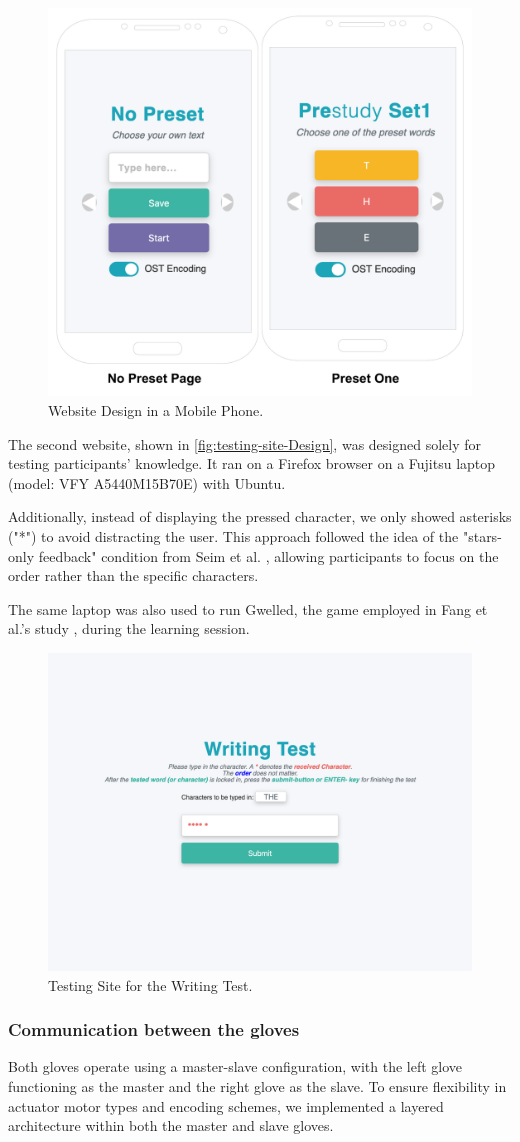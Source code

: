 \begin{figure}
    \centering
    \includegraphics[width=0.5\linewidth]{src/pictures/MobileWebsiteVersion.drawio.pdf}
    \caption{Website Design in a Mobile Phone.}
    \label{fig:Website-Design}
\end{figure}

The second website, shown in \autoref{fig:testing-site-Design}, was designed solely for testing participants' knowledge. It ran on a Firefox browser on a Fujitsu laptop (model: VFY A5440M15B70E) with Ubuntu.

Additionally, instead of displaying the pressed character, we only showed asterisks ("*") to avoid distracting the user. This approach followed the idea of the "stars-only feedback" condition from Seim et al. \cite{Seim2014}, allowing participants to focus on the order rather than the specific characters.

The same laptop was also used to run Gwelled, the game employed in Fang et al.'s study \cite{Fang2023}, during the learning session.

\begin{figure}
    \centering
    \includegraphics[width=0.5\linewidth]{src/pictures/testingSite.png}
    \caption{Testing Site for the Writing Test.}
    \label{fig:testing-site-Design}
\end{figure}


\subsubsection{Communication between the gloves}
Both gloves operate using a master-slave configuration, with the left glove functioning as the master and the right glove as the slave. To ensure flexibility in actuator motor types and encoding schemes, we implemented a layered architecture within both the master and slave gloves.

